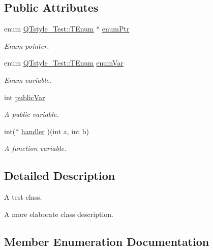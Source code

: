 \subsection*{Public Attributes}
\begin{DoxyCompactItemize}
\item 
enum \mbox{\hyperlink{class_q_tstyle___test_a0525f798cda415a94fedeceb806d2c49}{Q\+Tstyle\+\_\+\+Test\+::\+T\+Enum}} $\ast$ \mbox{\hyperlink{class_q_tstyle___test_a973a4566c9a036f4eca508ba5fe80dcb}{enum\+Ptr}}
\begin{DoxyCompactList}\small\item\em Enum pointer. \end{DoxyCompactList}\item 
enum \mbox{\hyperlink{class_q_tstyle___test_a0525f798cda415a94fedeceb806d2c49}{Q\+Tstyle\+\_\+\+Test\+::\+T\+Enum}} \mbox{\hyperlink{class_q_tstyle___test_adb265d815b43f1f7f0de0e8b8852a5d0}{enum\+Var}}
\begin{DoxyCompactList}\small\item\em Enum variable. \end{DoxyCompactList}\item 
int \mbox{\hyperlink{class_q_tstyle___test_aabf7b2e9ed83ea44aca4d213baae06d3}{public\+Var}}
\begin{DoxyCompactList}\small\item\em A public variable. \end{DoxyCompactList}\item 
int($\ast$ \mbox{\hyperlink{class_q_tstyle___test_a79dd4e5498f09057775a819d911349e2}{handler}} )(int a, int b)
\begin{DoxyCompactList}\small\item\em A function variable. \end{DoxyCompactList}\end{DoxyCompactItemize}


\subsection{Detailed Description}
A test class. 

A more elaborate class description. 

\subsection{Member Enumeration Documentation}
\mbox{\label{class_q_tstyle___test_a0525f798cda415a94fedeceb806d2c49}} 
